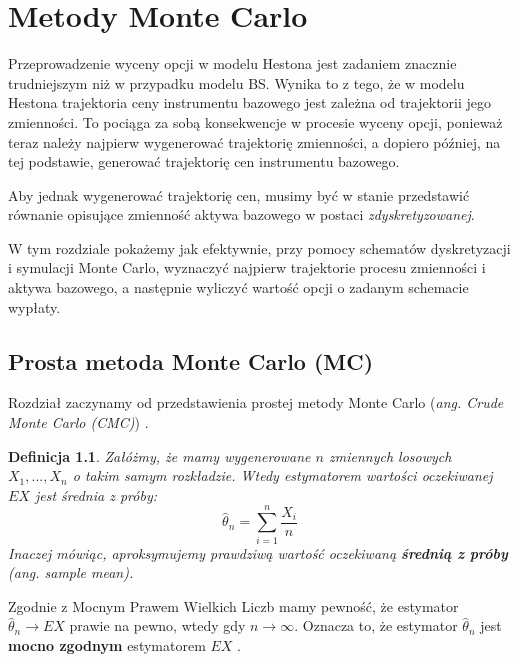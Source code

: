 \documentclass{pracamgr}
\newtheorem{defi}{Definicja}[section]
\begin{document}
\chapter{Metody Monte Carlo}
\label{chap:monteCarlo}

Przeprowadzenie wyceny opcji w modelu Hestona jest zadaniem znacznie trudniejszym
niż w przypadku modelu BS. Wynika to z tego, że w modelu Hestona trajektoria 
ceny instrumentu bazowego jest zależna od trajektorii jego zmienności. To pociąga za sobą
konsekwencje w procesie wyceny opcji, ponieważ teraz należy najpierw wygenerować trajektorię
zmienności, a dopiero później, na tej podstawie, generować trajektorię cen instrumentu bazowego.

Aby jednak wygenerować trajektorię cen, musimy być w stanie przedstawić równanie opisujące
zmienność aktywa bazowego w postaci \textit{zdyskretyzowanej}.

W tym rozdziale pokażemy jak efektywnie, przy pomocy schematów dyskretyzacji i symulacji Monte Carlo, 
wyznaczyć najpierw trajektorie procesu zmienności i aktywa bazowego, a następnie wyliczyć wartość
opcji o zadanym schemacie wypłaty.

\section{Prosta metoda Monte Carlo (MC)}
\label{sec:mc}

Rozdział zaczynamy od przedstawienia prostej metody 
Monte Carlo (\textit{ang. Crude Monte Carlo (CMC)}) \cite{Niemiro}.

\begin{defi}
Załóżmy, że mamy wygenerowane $n$ zmiennych losowych $X_1, ..., X_n$ o takim samym rozkładzie. 
Wtedy estymatorem wartości oczekiwanej $EX$ jest średnia z próby:
\begin{equation}
  \hat{\theta}_n = \sum_{i=1}^n \frac{X_i}{n}
\end{equation}
Inaczej mówiąc, aproksymujemy prawdziwą wartość oczekiwaną 
\textbf{średnią z próby} (\textit{ang. sample mean}).
\end{defi}


Zgodnie z Mocnym Prawem Wielkich Liczb mamy pewność, że estymator 
$\hat{\theta}_n \rightarrow EX$ prawie na pewno, wtedy gdy $n \rightarrow \infty$. 
Oznacza to, że estymator $\hat{\theta}_n $ jest \textbf{mocno zgodnym} 
estymatorem $EX$ \cite{Glasserman}.
\end{document}
